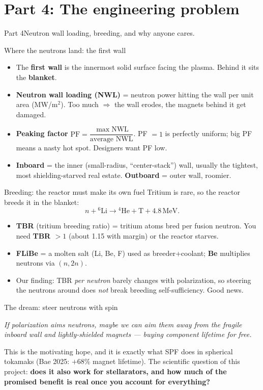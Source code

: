 \documentclass[11pt,aspectratio=169]{beamer}
\newcommand{\key}[1]{\textcolor{key}{\textbf{#1}}}
\newcommand{\qq}[1]{\begin{center}\emph{#1}\end{center}}
\begin{document}
\section{Part 4: The engineering problem}
\begin{frame}{Part 4}\Large Neutron wall loading, breeding, and why anyone cares.\end{frame}

\begin{frame}{Where the neutrons land: the first wall}
\begin{itemize}
\item The \key{first wall} is the innermost solid surface facing the plasma. Behind it sits
the \key{blanket}.
\item \key{Neutron wall loading (NWL)} = neutron power hitting the wall per unit area
(MW/m$^2$). Too much $\Rightarrow$ the wall erodes, the magnets behind it get damaged.
\item \key{Peaking factor} $\mathrm{PF} = \dfrac{\max \mathrm{NWL}}{\text{average }\mathrm{NWL}}$.
PF $=1$ is perfectly uniform; big PF means a nasty hot spot. Designers want PF low.
\item \key{Inboard} = the inner (small-radius, ``center-stack'') wall, usually the tightest,
most shielding-starved real estate. \key{Outboard} = outer wall, roomier.
\end{itemize}
\end{frame}

\begin{frame}{Breeding: the reactor must make its own fuel}
Tritium is rare, so the reactor breeds it in the blanket:
\[ n + {}^6\mathrm{Li} \rightarrow {}^4\mathrm{He} + \mathrm{T} + 4.8\,\text{MeV}.\]
\begin{itemize}
\item \key{TBR} (tritium breeding ratio) = tritium atoms bred per fusion neutron. You need
\key{TBR $> 1$} (about 1.15 with margin) or the reactor starves.
\item \key{FLiBe} = a molten salt (Li, Be, F) used as breeder+coolant; \key{Be} multiplies
neutrons via $(n,2n)$.
\item Our finding: TBR \emph{per neutron} barely changes with polarization, so steering the
neutrons around does \emph{not} break breeding self-sufficiency. Good news.
\end{itemize}
\end{frame}

\begin{frame}{The dream: steer neutrons with spin}
\qq{If polarization aims neutrons, maybe we can aim them \emph{away} from the fragile
inboard wall and lightly-shielded magnets --- buying component lifetime for free.}
This is the motivating hope, and it is exactly what SPF does in spherical tokamaks (Bae 2025:
$+68\%$ magnet lifetime). The scientific question of this project:
\key{does it also work for stellarators, and how much of the promised benefit is real once
you account for everything?}
\end{frame}
\end{document}
